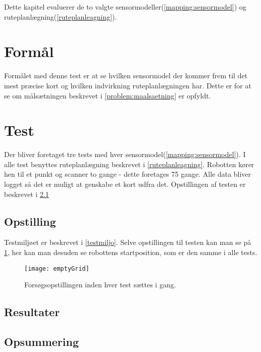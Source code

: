 Dette kapitel evaluerer de to valgte sensormodeller(\cref{mapping:sensormodel}) og ruteplanlægning(\cref{ruteplanleagning}).

\section{Formål}
Formålet med denne test er at se hvilken sensormodel der kommer frem til det mest præcise kort og hvilken indvirkning ruteplanlægningen har.
Dette er for at se om målsætningen beskrevet i \cref{problem:maalsaetning} er opfyldt.

\section{Test}\label{evaluering:test_beskrivelse}
Der bliver foretaget tre tests med hver sensormodel(\cref{mapping:sensormodel}).
I alle test benyttes ruteplanlægning beskrevet i \cref{ruteplanleagning}.
Robotten kører hen til et punkt og scanner to gange - dette foretages 75 gange.
Alle data bliver logget så det er muligt at genskabe et kort udfra det.
Opstillingen af testen er beskrevet i \cref{evaluering:opstilling}

\subsection{Opstilling}\label{evaluering:opstilling}
Testmiljøet er beskrevet i \cref{testmiljo}.
Selve opstillingen til testen kan man se på \cref{evaluering:emptyGrid}, her kan man desuden se robottens startposition, som er den samme i alle tests.

\begin{figure}[h]
\texttt{[image: emptyGrid]}
\label{evaluering:emptyGrid}
\caption{Forsøgsopstillingen inden hver test sættes i gang.}
\end{figure}
\subsection{Resultater}

\subsection{Opsummering}